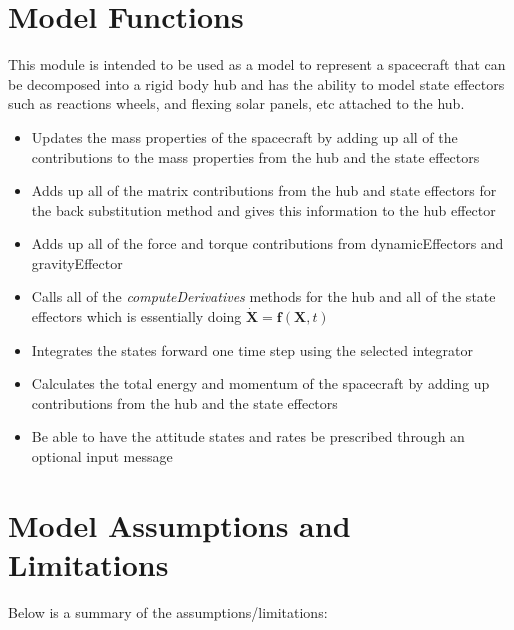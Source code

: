 \section{Model Functions}

This module is intended to be used as a model to represent a spacecraft that can be decomposed into a rigid body hub and has the ability to model state effectors such as reactions wheels, and flexing solar panels, etc attached to the hub.  

\begin{itemize}
	\item Updates the mass properties of the spacecraft by adding up all of the contributions to the mass properties from the hub and the state effectors
	\item Adds up all of the matrix contributions from the hub and state effectors for the back substitution method and gives this information to the hub effector
	\item Adds up all of the force and torque contributions from dynamicEffectors and gravityEffector
	\item Calls all of the \textit{computeDerivatives} methods for the hub and all of the state effectors which is essentially doing $\dot{\bm X} = \bm f(\bm X, t)$
	\item Integrates the states forward one time step using the selected integrator
	\item Calculates the total energy and momentum of the spacecraft by adding up contributions from the hub and the state effectors
	\item Be able to have the attitude states and rates be prescribed through an optional input message
\end{itemize}

\section{Model Assumptions and Limitations}
Below is a summary of the assumptions/limitations:

